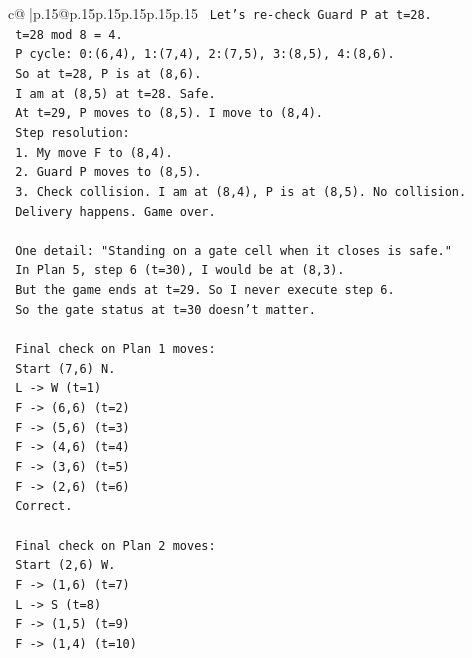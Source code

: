\documentclass{article}
\begin{document}
{\begin{supertabular}{c@{$\;$}|p{.15\linewidth}@{}p{.15\linewidth}p{.15\linewidth}p{.15\linewidth}p{.15\linewidth}p{.15\linewidth}}
{{{\texttt{   Let's re{-}check Guard P at t=28.} \\
\texttt{   t=28 mod 8 = 4.} \\
\texttt{   P cycle: 0:(6,4), 1:(7,4), 2:(7,5), 3:(8,5), 4:(8,6).} \\
\texttt{   So at t=28, P is at (8,6).} \\
\texttt{   I am at (8,5) at t=28. Safe.} \\
\texttt{   At t=29, P moves to (8,5). I move to (8,4).} \\
\texttt{   Step resolution:} \\
\texttt{   1. My move F to (8,4).} \\
\texttt{   2. Guard P moves to (8,5).} \\
\texttt{   3. Check collision. I am at (8,4), P is at (8,5). No collision.} \\
\texttt{   Delivery happens. Game over.} \\
\\ 
\texttt{   One detail: "Standing on a gate cell when it closes is safe."} \\
\texttt{   In Plan 5, step 6 (t=30), I would be at (8,3).} \\
\texttt{   But the game ends at t=29. So I never execute step 6.} \\
\texttt{   So the gate status at t=30 doesn't matter.} \\
\\ 
\texttt{   Final check on Plan 1 moves:} \\
\texttt{   Start (7,6) N.} \\
\texttt{   L {-}> W (t=1)} \\
\texttt{   F {-}> (6,6) (t=2)} \\
\texttt{   F {-}> (5,6) (t=3)} \\
\texttt{   F {-}> (4,6) (t=4)} \\
\texttt{   F {-}> (3,6) (t=5)} \\
\texttt{   F {-}> (2,6) (t=6)} \\
\texttt{   Correct.} \\
\\ 
\texttt{   Final check on Plan 2 moves:} \\
\texttt{   Start (2,6) W.} \\
\texttt{   F {-}> (1,6) (t=7)} \\
\texttt{   L {-}> S (t=8)} \\
\texttt{   F {-}> (1,5) (t=9)} \\
\texttt{   F {-}> (1,4) (t=10)} \\
}}}
\end{supertabular}}
\end{document}
